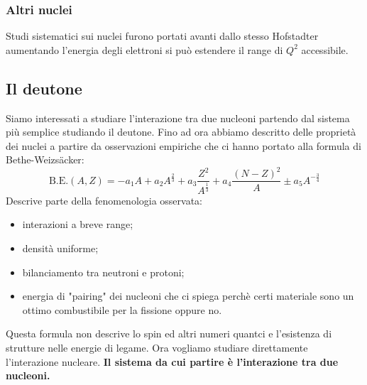 \subsubsection{Altri nuclei}
Studi sistematici sui nuclei furono portati avanti dallo stesso Hofstadter aumentando l'energia degli elettroni si può estendere il range di $Q^2$ accessibile. 
\subsection{Il deutone}
Siamo interessati a studiare l'interazione tra due nucleoni partendo dal sistema più semplice studiando il deutone. Fino ad ora abbiamo descritto delle proprietà dei nuclei a partire da osservazioni empiriche che ci hanno portato alla formula di Bethe-Weizs\"acker:
\begin{equation*}
     \text{B.E.}(A,Z)=-a_{1}A+a_{2}A^{\frac{2}{3}}+a_{3}{\frac {Z^2}{A^{\frac{1}{3}}}}+a_{4}{\frac {(N-Z)^{2}}{A}}\pm a_5 A^{-\frac{3}{4}}
\end{equation*}
Descrive parte della fenomenologia osservata: 
\begin{itemize}
    \item interazioni a breve range;
    \item densità uniforme;
    \item bilanciamento tra neutroni e protoni;
    \item energia di "pairing" dei nucleoni che ci spiega perchè certi materiale sono un ottimo combustibile per la fissione oppure no.
\end{itemize}
Questa formula non descrive lo spin ed altri numeri quantci e l'esistenza di strutture nelle energie di legame. Ora vogliamo studiare direttamente l'interazione nucleare. \textbf{Il sistema da cui partire è l'interazione tra due nucleoni.}
